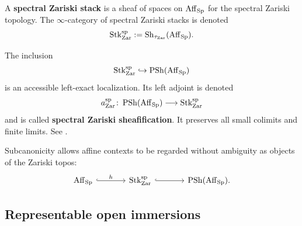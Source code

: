 \begin{definition}
\label{def:spectral-zariski-stack}
A \textbf{spectral Zariski stack} is a sheaf of spaces on
$\operatorname{Aff}_{\operatorname{Sp}}$ for the spectral Zariski topology. The
$\infty$-category of spectral Zariski stacks is denoted
\[
    \operatorname{Stk}^{\mathrm{sp}}_{\mathrm{Zar}}
    :=
    \operatorname{Sh}_{\tau_{\mathrm{Zar}}}
    (\operatorname{Aff}_{\operatorname{Sp}}).
\]
\end{definition}

\begin{construction}
\label{con:spectral-zariski-sheafification}
The inclusion
\[
    \operatorname{Stk}^{\mathrm{sp}}_{\mathrm{Zar}}
    \hookrightarrow
    \operatorname{PSh}(\operatorname{Aff}_{\operatorname{Sp}})
\]
is an accessible left-exact localization. Its left adjoint is denoted
\[
    a^{\mathrm{sp}}_{\mathrm{Zar}}
    \colon
    \operatorname{PSh}(\operatorname{Aff}_{\operatorname{Sp}})
    \longrightarrow
    \operatorname{Stk}^{\mathrm{sp}}_{\mathrm{Zar}}
\]
and is called \textbf{spectral Zariski sheafification}. It preserves all
small colimits and finite limits. See \cite{LurieSAG}.
\end{construction}

Subcanonicity allows affine contexts to be regarded without ambiguity as
objects of the Zariski topos:
\[
\begin{tikzcd}[column sep=large]
    \Aff_{\Sp}
        \arrow[r, hook, "h"]
    &
    \operatorname{Stk}^{\mathrm{sp}}_{\mathrm{Zar}}
        \arrow[r, hook]
    &
    \PSh(\Aff_{\Sp}).
\end{tikzcd}
\]

\subsection{Representable open immersions}

